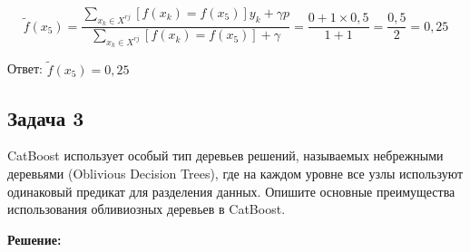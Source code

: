 $$
\tilde{f}(x_5) = \dfrac{\sum\limits_{x_k \in X^{rj}} [f(x_k) = f(x_5)] y_k + \gamma p}{\sum\limits_{x_k \in X^{rj}} [f(x_k) = f(x_5)] + \gamma} = \dfrac{0 + 1 \times 0{,}5}{1 + 1} = \dfrac{0{,}5}{2} = 0{,}25
$$

Ответ: $\tilde{f}(x_5) = 0{,}25$

\subsection*{Задача 3}

CatBoost использует особый тип деревьев решений, называемых небрежными деревьями (Oblivious Decision Trees), где на каждом уровне все узлы используют одинаковый предикат для разделения данных. Опишите основные преимущества использования обливиозных деревьев в CatBoost.

\textbf{Решение:}

